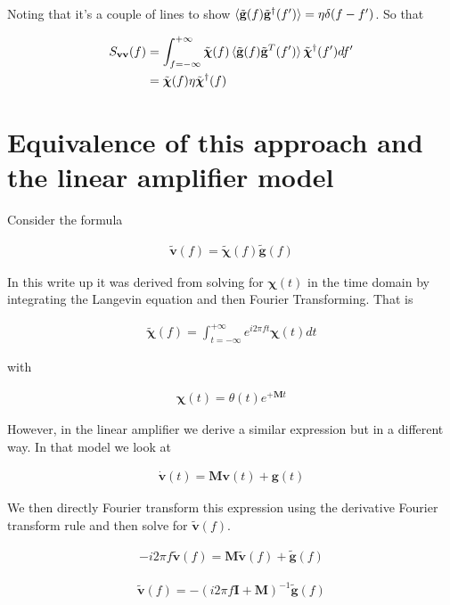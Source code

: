 \documentclass[12pt]{article}
\newcommand{\bv}[1]{\mathbf{#1}}
\begin{document}
Noting that it's a couple of lines to show $\braket{\tilde{\bv{g}}(f)\tilde{\bv{g}}^{\dag}(f')} = \bv{\eta}\delta(f-f')$. So that

\begin{align}
S_{\bv{v}\bv{v}}(f) &= \int_{f=-\infty}^{+\infty} \tilde{\boldsymbol{\chi}}(f)\braket{\tilde{\bv{g}}(f)\tilde{\bv{g}}^T(f')} \tilde{\boldsymbol{\chi}}^{\dag}(f')df'\\
&= \tilde{\boldsymbol{\chi}}(f) \bv{\eta} \tilde{\boldsymbol{\chi}}^{\dag}(f)
\end{align}

\section{Equivalence of this approach and the linear amplifier model}
Consider the formula

\begin{align}
\tilde{\bv{v}}(f) = \tilde{\boldsymbol{\chi}}(f) \tilde{\bv{g}}(f)
\end{align}

In this write up it was derived from solving for $\boldsymbol{\chi}(t)$ in the time domain by integrating the Langevin equation and then Fourier Transforming. That is

\begin{align}
\tilde{\boldsymbol{\chi}}(f) = \int_{t=-\infty}^{+\infty} e^{i 2\pi f t}\boldsymbol{\chi}(t) dt
\end{align}

with

\begin{align}
\boldsymbol{\chi}(t) = \theta(t) e^{+\bv{M}t}
\end{align}

However, in the linear amplifier we derive a similar expression but in a different way. In that model we look at

\begin{align}
\dot{\bv{v}}(t) = \bv{M}\bv{v}(t) + \bv{g}(t)
\end{align}

We then directly Fourier transform this expression using the derivative Fourier transform rule and then solve for $\tilde{\bv{v}}(f)$.

\begin{align}
-i 2\pi f \tilde{\bv{v}}(f) = \bv{M}\tilde{\bv{v}}(f) + \tilde{\bv{g}}(f)
\end{align}

\begin{align}
\tilde{\bv{v}}(f) = -(i2\pi f \bv{I} + \bv{M})^{-1} \tilde{\bv{g}}(f)
\end{align}
\end{document}
